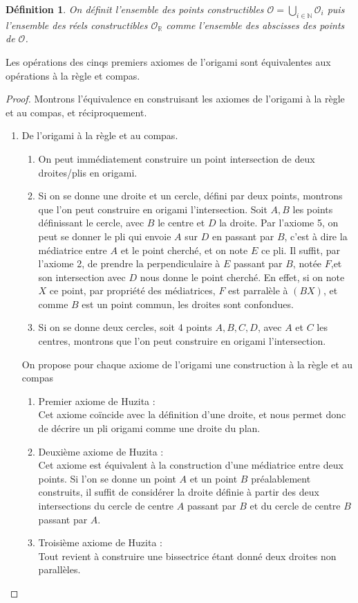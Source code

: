 \documentclass[a4paper,12pt,french,draft]{report}
\newtheorem{definition}{Définition}[section]
\begin{document}
			\begin{definition}
				On définit l'ensemble des points constructibles \(\mathcal{O} = \bigcup_{i \in \mathbb{N}} \mathcal{O}_i \) puis l'ensemble des réels constructibles \(\mathcal{O}_\mathbb{R}\) comme l'ensemble des abscisses des points de \( \mathcal{O} \).
			\end{definition}

			\begin{proposition}
			Les opérations des cinqs premiers axiomes de l'origami sont équivalentes aux opérations à la règle et compas.
			\end{proposition}
			\begin{proof}
			Montrons l'équivalence en construisant les axiomes de l'origami à la règle et au compas, et réciproquement.
			\begin{enumerate}
				\item De l'origami à la règle et au compas.
				\begin{enumerate}
					\item On peut immédiatement construire un point intersection de deux droites\slash plis en origami.
					\item Si on se donne une droite et un cercle, défini par deux points, montrons que l'on peut construire en origami l'intersection.
					Soit $A,B$ les points définissant le cercle, avec $B$ le centre et $D$ la droite. Par l'axiome 5, on peut se donner le pli qui envoie $A$ sur $D$ en passant par $B$, c'est à dire la médiatrice entre $A$ et le point cherché, et on note $E$ ce pli. Il suffit, par l'axiome 2, de prendre la perpendiculaire à $E$ passant par $B$, notée $F$,et son intersection avec $D$ nous donne le point cherché. En effet, si on note $X$ ce point, par propriété des médiatrices, $F$ est parralèle à $(BX)$, et comme $B$ est un point commun, les droites sont confondues.
					\item Si on se donne deux cercles, soit 4 points $A,B,C,D$, avec $A$ et $C$ les centres, montrons que l'on peut construire en origami l'intersection.
				\end{enumerate}
				
				On propose pour chaque axiome de l'origami une construction à la règle et au compas
			\begin{enumerate}
				\item{Premier axiome de Huzita :} \\
					Cet axiome coïncide avec la définition d'une droite, et nous permet donc de décrire un pli origami comme une droite du plan.
				\item{Deuxième axiome de Huzita :}\\
					Cet axiome est équivalent à la construction d'une médiatrice entre deux points. Si l'on se donne un point $A$ et un point $B$ préalablement construits, il suffit de considérer la droite définie à partir des deux intersections du cercle de centre $A$ passant par $B$ et du cercle de centre $B$ passant par $A$.
				\item{Troisième axiome de Huzita :}\\
					Tout revient à construire une bissectrice étant donné deux droites non parallèles.
					

\end{enumerate}
\end{enumerate}
\end{proof}
\end{document}
